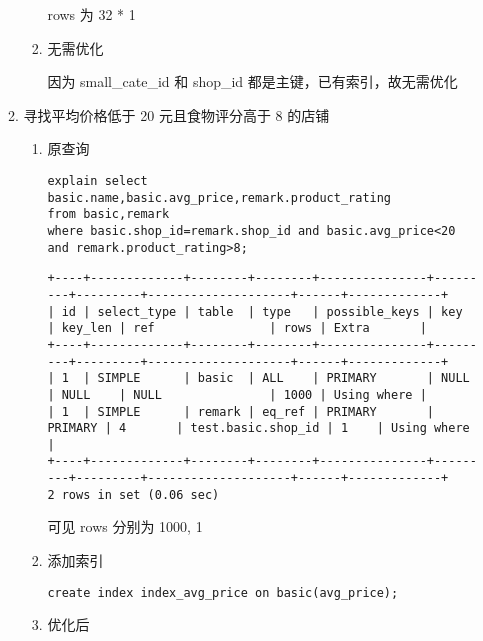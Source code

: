 \documentclass[11pt]{article}
\begin{document}
\begin{itemize}
\begin{enumerate}
\begin{enumerate}
rows 为 32 * 1

\item 无需优化

因为 small\_cate\_id 和 shop\_id 都是主键，已有索引，故无需优化
\end{enumerate}

\item 寻找平均价格低于 20 元且食物评分高于 8 的店铺
\begin{enumerate}
\item 原查询

\begin{lstlisting}
explain select basic.name,basic.avg_price,remark.product_rating
from basic,remark
where basic.shop_id=remark.shop_id and basic.avg_price<20 and remark.product_rating>8;
\end{lstlisting}

\begin{verbatim}
+----+-------------+--------+--------+---------------+---------+---------+--------------------+------+-------------+
| id | select_type | table  | type   | possible_keys | key     | key_len | ref                | rows | Extra       |
+----+-------------+--------+--------+---------------+---------+---------+--------------------+------+-------------+
| 1  | SIMPLE      | basic  | ALL    | PRIMARY       | NULL    | NULL    | NULL               | 1000 | Using where |
| 1  | SIMPLE      | remark | eq_ref | PRIMARY       | PRIMARY | 4       | test.basic.shop_id | 1    | Using where |
+----+-------------+--------+--------+---------------+---------+---------+--------------------+------+-------------+
2 rows in set (0.06 sec)
\end{verbatim}

可见 rows 分别为 1000, 1
\item 添加索引

\begin{lstlisting}
create index index_avg_price on basic(avg_price);
\end{lstlisting}
\item 优化后


\end{enumerate}
\end{enumerate}
\end{itemize}
\end{document}
